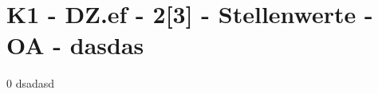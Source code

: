 \section{K1 - DZ.ef - 2[3] - Stellenwerte - OA - dasdas}

\begin{langesbeispiel}\item[0] %
dsadasd

\end{langesbeispiel}